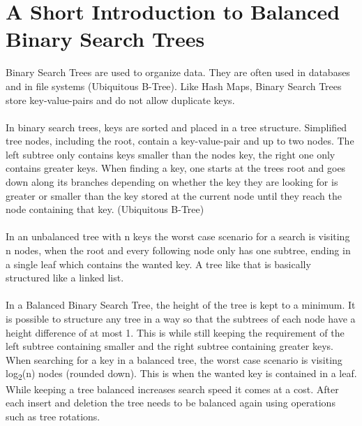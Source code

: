\section{A Short Introduction to Balanced Binary Search Trees}
Binary Search Trees are used to organize data. They are often used in databases and in file systems (Ubiquitous B-Tree). Like Hash Maps, Binary Search Trees store key-value-pairs and do not allow duplicate keys.\\\\
In binary search trees, keys are sorted and placed in a tree structure. Simplified tree nodes, including the root, contain a key-value-pair and up to two nodes. The left subtree only contains keys smaller than the nodes key, the right one only contains greater keys. When finding a key, one starts at the trees root and goes down along its branches depending on whether the key they are looking for is greater or smaller than the key stored at the current node until they reach the node containing that key. (Ubiquitous B-Tree)\\\\
In an unbalanced tree with n keys the worst case scenario for a search is visiting n nodes, when the root and every following node only has one subtree, ending in a single leaf which contains the wanted key. A tree like that is basically structured like a linked list.\\\\
In a Balanced Binary Search Tree, the height of the tree is kept to a minimum. It is possible to structure any tree in a way so that the subtrees of each node have a height difference of at most 1.
This is while still keeping the requirement of the left subtree containing smaller and the right subtree containing greater keys.\\
When searching for a key in a balanced tree, the worst case scenario is visiting log\textsubscript{2}(n) nodes (rounded down). This is when the wanted key is contained in a leaf.\\ While keeping a tree balanced increases search speed it comes at a cost. After each insert and deletion the tree needs to be balanced again using operations such as tree rotations.\\ 